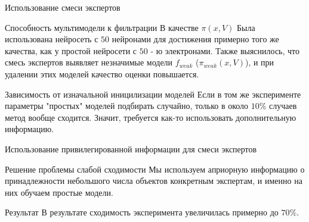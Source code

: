\documentclass{beamer}
\begin{document}
\begin{frame}{Использование смеси экспертов}
\begin{block}{Способность мультимодели к фильтрации}
В качестве $\pi(x, V)$ Была использована нейросеть с $50$ нейронами для достижения примерно того же качества, как у  простой нейросети  с $50$ - ю электронами. Также выяснилось, что смесь экспертов выявляет незначимые модели $f_{weak}$ ($\pi_{weak} (x, V)$), и при удалении этих моделей качество оценки повышается. 
\end{block}


\begin{block}{Зависимость от изначальной иницилизации моделей}
Если в том же эксперименте  параметры "простых" моделей  подбирать случайно, только в около $10 \% $ случаев метод вообще  сходится. Значит, требуется как-то использовать дополнительную информацию.
\end{block}
\end{frame}


\begin{frame}{Использование привилегированной информации для смеси экспертов}
\begin{block}{Решение проблемы слабой сходимости}
Мы используем априорную информацию о принадлежности небольшого числа объектов конкретным экспертам, и именно на них 
обучаем простые модели. 

\begin{figure}[!htb]
\end{figure}

\end{block}

\begin{block}{Результат}
В результате сходимость эксперимента увеличилась примерно до $70 \%$. 
\end{block}

\end{frame}
\end{document}
